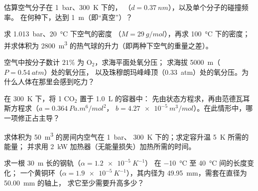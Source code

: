 \begin{exercise}[$\star$]\label{exo:b1:kinetic-theory:4}
估算空气分子在 \qty{1}{bar}、\qty{300}{K} 下的，
（$d = \qty{0.37}{nm}$），以及单个分子的碰撞频率。
在何种下，达到 \qty{1}{m}（即“真空”）？
\end{exercise}

\begin{exercise}[$\star\star$]\label{exo:b1:kinetic-theory:5}
求 \qty{1.013}{bar}、\qty{20}{\degreeCelsius} 下空气的密度
（$M = \qty{29}{g/mol}$），再求 \qty{100}{\degreeCelsius} 下的密度；
并求体积为 \qty{2800}{m^3} 的热气球的升力（即两种下空气的重量之差）。
\end{exercise}

\begin{exercise}[$\star\star$]\label{exo:b1:kinetic-theory:6}
空气中按分子数计 $21\%$ 为 O$_2$，求海平面处氧分压；
求海拔 \qty{5000}{m}（$P = \qty{0.54}{atm}$）处的氧分压，
以及珠穆朗玛峰峰顶（\qty{0.33}{atm}）处的氧分压。为什么人体在那里会感到吃力？
\end{exercise}

\begin{exercise}[$\star\star$]\label{exo:b1:kinetic-theory:7}
在 \qty{300}{K} 下，将 1  CO$_2$ 置于 \qty{1.0}{L} 的容器中：
先由状态方程求，再由范德瓦耳斯方程求（$a = \qty{0.364}{Pa.m^6/mol^2}$，
$b = \qty{4.27e-5}{m^3/mol}$）。在此情形中，哪一项修正占主导？
\end{exercise}

\begin{exercise}[$\star\star$]\label{exo:b1:kinetic-theory:8}
求体积为 \qty{50}{m^3} 的房间内空气在 \qty{1}{bar}、
\qty{300}{K} 下的；求定容升温 \qty{5}{K} 所需的能量；
并求用 \qty{2}{kW} 加热器（无能量损失）加热所需的时间。
\end{exercise}

\begin{exercise}[$\star\star$]\label{exo:b1:kinetic-theory:9}
求一根 \qty{30}{m} 长的钢轨（$\alpha = \qty{1.2e-5}{K^{-1}}$）
在 \qty{-10}{\degreeCelsius} 至 \qty{40}{\degreeCelsius} 间的长度变化；
一个黄铜环（$\alpha = \qty{1.9e-5}{K^{-1}}$），其内径为
\qty{49.95}{mm}，需套在直径为 \qty{50.00}{mm} 的轴上，
求它至少需要升高多少？
\end{exercise}

